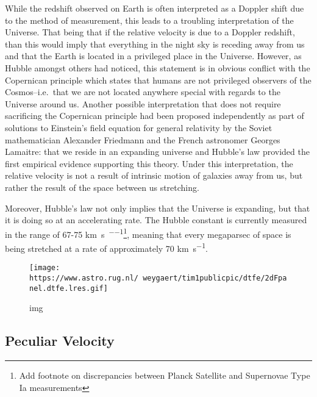 While the redshift observed on Earth is often interpreted as a Doppler
shift due to the method of measurement, this leads to a troubling
interpretation of the Universe. That being that if the relative velocity
is due to a Doppler redshift, than this would imply that everything in
the night sky is receding away from us and that the Earth is located in
a privileged place in the Universe. However, as Hubble amongst others
had noticed, this statement is in obvious conflict with the Copernican
principle which states that humans are not privileged observers of the
Cosmos--i.e.~that we are not located anywhere special with regards to
the Universe around us. Another possible interpretation that does not
require sacrificing the Copernican principle had been proposed
independently as part of solutions to Einstein's field equation for
general relativity by the Soviet mathematician Alexander Friedmann and
the French astronomer Georges Lamaitre: that we reside in an expanding
universe and Hubble's law provided the first empirical evidence
supporting this theory. Under this interpretation, the relative velocity
is not a result of intrinsic motion of galaxies away from us, but rather
the result of the space between us stretching.

Moreover, Hubble's law not only implies that the Universe is expanding,
but that it is doing so at an accelerating rate. The Hubble constant is
currently measured in the range of 67-75
\si{\km\per\s\per\Mpc}\footnote{Add footnote on discrepancies between Planck Satellite and Supernovae Type Ia measurements},
meaning that every megaparsec of space is being stretched at a rate of
approximately 70 \si{km\per\s}.

\begin{figure}
\centering
\texttt{[image: https://www.astro.rug.nl/~weygaert/tim1publicpic/dtfe/2dFpanel.dtfe.lres.gif]}
\caption{img}
\end{figure}

\subsection{Peculiar Velocity}\label{peculiar-velocity}

